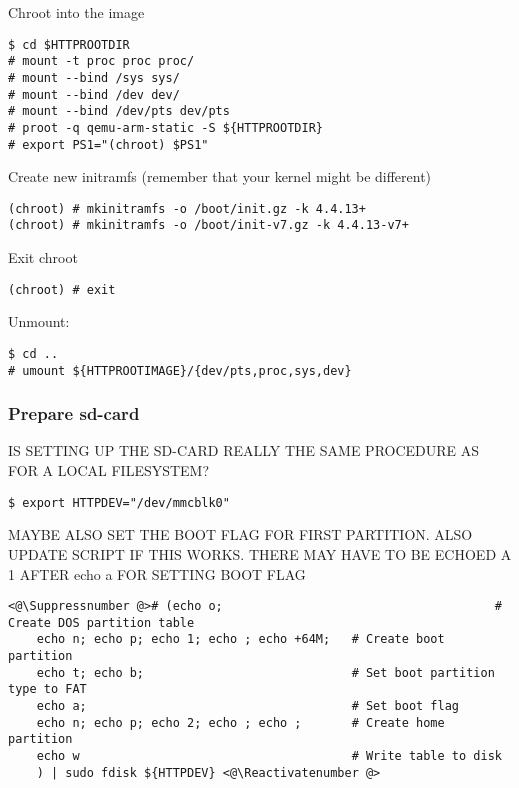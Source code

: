 Chroot into the image
\begin{lstlisting}[]
$ cd $HTTPROOTDIR
# mount -t proc proc proc/
# mount --bind /sys sys/
# mount --bind /dev dev/
# mount --bind /dev/pts dev/pts
# proot -q qemu-arm-static -S ${HTTPROOTDIR}
# export PS1="(chroot) $PS1"
\end{lstlisting}
\FloatBarrier
\vspace{-5mm}


Create new initramfs (remember that your kernel might be different)
\begin{lstlisting}[]
(chroot) # mkinitramfs -o /boot/init.gz -k 4.4.13+
(chroot) # mkinitramfs -o /boot/init-v7.gz -k 4.4.13-v7+
\end{lstlisting}
\FloatBarrier
\vspace{-5mm}

Exit chroot
\begin{lstlisting}[]
(chroot) # exit
\end{lstlisting}
\FloatBarrier
\vspace{-5mm}

Unmount:
\begin{lstlisting}[]
$ cd ..
# umount ${HTTPROOTIMAGE}/{dev/pts,proc,sys,dev}
\end{lstlisting}
\FloatBarrier
\vspace{-5mm}


\subsubsection{Prepare sd-card}

IS SETTING UP THE SD-CARD REALLY THE SAME PROCEDURE AS FOR A LOCAL FILESYSTEM?

\begin{lstlisting}[]
$ export HTTPDEV="/dev/mmcblk0"
\end{lstlisting}
\FloatBarrier
\vspace{-5mm}

MAYBE ALSO SET THE BOOT FLAG FOR FIRST PARTITION. ALSO UPDATE SCRIPT IF THIS
WORKS. THERE MAY HAVE TO BE ECHOED A 1 AFTER echo a FOR SETTING BOOT FLAG
\begin{lstlisting}[]
<@\Suppressnumber @># (echo o;                                      # Create DOS partition table
    echo n; echo p; echo 1; echo ; echo +64M;   # Create boot partition
    echo t; echo b;                             # Set boot partition type to FAT
    echo a;                                     # Set boot flag
    echo n; echo p; echo 2; echo ; echo ;       # Create home partition
    echo w                                      # Write table to disk
    ) | sudo fdisk ${HTTPDEV} <@\Reactivatenumber @>
\end{lstlisting}
\FloatBarrier
\vspace{-5mm}

